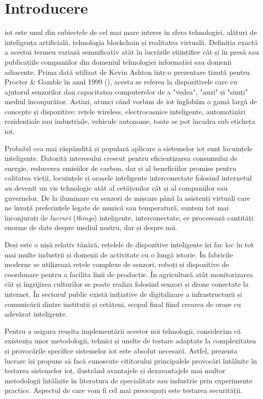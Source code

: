 \chapter{Introducere}

\acrlong{iot} este unul din subiectele de cel mai mare interes în sfera tehnologiei,
alături de inteligența artificială, tehnologia blockchain și realitatea virtuală. 
Definiția exactă a acestui termen variază semnificativ atât în lucrările
științifice cât și în presă sau publicațiile companiilor din domeniul tehnologiei informației sau domenii adiacente. Prima dată utilizat de Kevin Ashton într-o prezentare ținută pentru Procter \& Gamble în anul 1999 (\cite{ashton_2009}), acesta se referea la dispozitivele care cu ajutorul senzorilor dau capacitatea computerelor de a "vedea", "auzi" și "simți" mediul înconjurător. Astăzi, atunci când vorbim de \acrshort{iot} înglobăm o gamă largă de concepte și dispozitive: rețele wireless, electrocasnice inteligente, automatizări rezidențiale sau industriale, vehicule autonome, toate se pot încadra sub eticheta \acrshort{iot}.

Probabil cea mai răspândită și populară aplicare a sistemelor \acrshort{iot} sunt locuințele inteligente. Datorită interesului crescut pentru eficientizarea consumului de energie, reducerea emisiilor de carbon, dar și al beneficiilor promise pentru calitatea vieții, locuințele și orașele inteligente interconectate folosind internetul au devenit un vis tehnologic atât al cetățenilor cât și al companiilor sau guvernelor. De la iluminare cu senzori de mișcare până la asistenți virtuali care ne învață preferințele legate de muzică sau temperatură, suntem tot mai înconjurați de \textit{lucruri} (\textit{things}) inteligente, interconectate, ce procesează cantități enorme de date despre mediul nostru, dar și despre noi. 

Deși este o nișă relativ tânără, rețelele de dispozitive inteligente își fac loc în tot mai multe industrii și domenii de activitate cu o lungă istorie. În fabricile moderne se utilizează rețele complexe de senzori, roboți și dispozitive de coordonare pentru a facilita linii de producție. În agricultură atât monitorizarea cât și îngrijirea culturilor se poate realiza folosind senzori și drone conectate la internet. În sectorul public există inițiative de digitalizare a infrastructurii și comunicării dintre instituții și cetățeni, scopul final fiind crearea de orașe cu adevărat inteligente. 

Pentru a asigura reușita implementării acestor noi tehnologii, considerăm că existența unor metodologii, tehnici și unelte de testare adaptate la complexitatea și provocările specifice sistemelor \acrshort{iot} este absolut necesară. Astfel, prezenta lucrare își propune să facă cunoscute cititorului principalele provocări întâlnite în testarea sistemelor \acrshort{iot}, ilustrând avantajele și dezavantajele mai multor metodologii întâlnite în literatura de specialitate sau industrie prin experimente practice. Aspectul de care vom fi cel mai preocupați este testarea securității.


